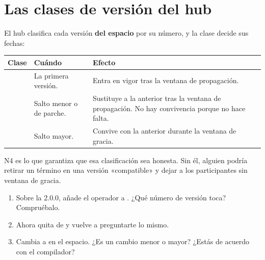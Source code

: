 \section{Las clases de versión del hub}

El hub clasifica cada versión \textbf{del espacio} por su número, y la clase decide sus fechas:

\noindent\begin{tabularx}{\linewidth}{@{}L{2.6cm}L{4.4cm}Y@{}}
\toprule
\textbf{Clase} & \textbf{Cuándo} & \textbf{Efecto} \\
\midrule
{} & La primera versión. & Entra en vigor tras la ventana de propagación. \\
 & Salto menor o de parche. & Sustituye a la anterior tras la ventana de propagación. No hay convivencia porque no hace falta. \\
 & Salto mayor. & Convive con la anterior durante la ventana de gracia. \\
\bottomrule
\end{tabularx}

\medskip
N4 es lo que garantiza que esa clasificación sea honesta. Sin él, alguien podría retirar un término en una
versión «compatible» y dejar a los participantes sin ventana de gracia.

\begin{retos}
\begin{enumerate}[leftmargin=*, itemsep=2pt]
  \item Sobre la 2.0.0, añade el operador  a . ¿Qué número de versión toca? Compruébalo.
  \item Ahora quita  de  y vuelve a preguntarte lo mismo.
  \item Cambia  a  en el espacio. ¿Es un cambio menor o mayor? ¿Estás
        de acuerdo con el compilador?
\end{enumerate}
\end{retos}
